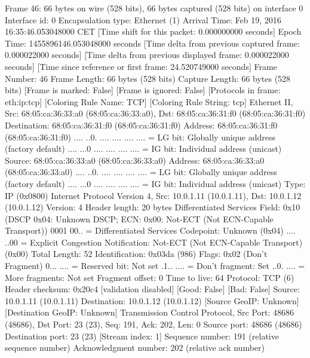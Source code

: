 Frame 46: 66 bytes on wire (528 bits), 66 bytes captured (528 bits) on interface 0
    Interface id: 0
    Encapsulation type: Ethernet (1)
    Arrival Time: Feb 19, 2016 16:35:46.053048000 CET
    [Time shift for this packet: 0.000000000 seconds]
    Epoch Time: 1455896146.053048000 seconds
    [Time delta from previous captured frame: 0.000022000 seconds]
    [Time delta from previous displayed frame: 0.000022000 seconds]
    [Time since reference or first frame: 24.520749000 seconds]
    Frame Number: 46
    Frame Length: 66 bytes (528 bits)
    Capture Length: 66 bytes (528 bits)
    [Frame is marked: False]
    [Frame is ignored: False]
    [Protocols in frame: eth:ip:tcp]
    [Coloring Rule Name: TCP]
    [Coloring Rule String: tcp]
Ethernet II, Src: 68:05:ca:36:33:a0 (68:05:ca:36:33:a0), Dst: 68:05:ca:36:31:f0 (68:05:ca:36:31:f0)
    Destination: 68:05:ca:36:31:f0 (68:05:ca:36:31:f0)
        Address: 68:05:ca:36:31:f0 (68:05:ca:36:31:f0)
        .... ..0. .... .... .... .... = LG bit: Globally unique address (factory default)
        .... ...0 .... .... .... .... = IG bit: Individual address (unicast)
    Source: 68:05:ca:36:33:a0 (68:05:ca:36:33:a0)
        Address: 68:05:ca:36:33:a0 (68:05:ca:36:33:a0)
        .... ..0. .... .... .... .... = LG bit: Globally unique address (factory default)
        .... ...0 .... .... .... .... = IG bit: Individual address (unicast)
    Type: IP (0x0800)
Internet Protocol Version 4, Src: 10.0.1.11 (10.0.1.11), Dst: 10.0.1.12 (10.0.1.12)
    Version: 4
    Header length: 20 bytes
    Differentiated Services Field: 0x10 (DSCP 0x04: Unknown DSCP; ECN: 0x00: Not-ECT (Not ECN-Capable Transport))
        0001 00.. = Differentiated Services Codepoint: Unknown (0x04)
        .... ..00 = Explicit Congestion Notification: Not-ECT (Not ECN-Capable Transport) (0x00)
    Total Length: 52
    Identification: 0x03da (986)
    Flags: 0x02 (Don't Fragment)
        0... .... = Reserved bit: Not set
        .1.. .... = Don't fragment: Set
        ..0. .... = More fragments: Not set
    Fragment offset: 0
    Time to live: 64
    Protocol: TCP (6)
    Header checksum: 0x20c4 [validation disabled]
        [Good: False]
        [Bad: False]
    Source: 10.0.1.11 (10.0.1.11)
    Destination: 10.0.1.12 (10.0.1.12)
    [Source GeoIP: Unknown]
    [Destination GeoIP: Unknown]
Transmission Control Protocol, Src Port: 48686 (48686), Dst Port: 23 (23), Seq: 191, Ack: 202, Len: 0
    Source port: 48686 (48686)
    Destination port: 23 (23)
    [Stream index: 1]
    Sequence number: 191    (relative sequence number)
    Acknowledgment number: 202    (relative ack number)
